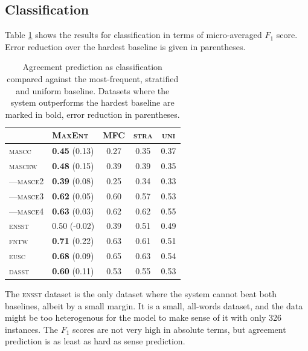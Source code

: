 \documentclass[11pt,a4paper]{article}
\begin{document}
\subsection{Classification}
\label{sec:class}

Table \ref{tab:classresults} shows the results for classification in terms of micro-averaged $F_1$ score. Error reduction over the hardest baseline is given in parentheses.

\begin{table}[Ht!]

\begin{center}
  \begin{tabular}{ll|ccc}
 \toprule
 & \textsc{MaxEnt} & \textsc{MFC} & \textsc{stra} & \textsc{uni} \\
 \midrule
 \textsc{mascc} & \textbf{0.45} (0.13) & 0.27 & 0.35 & 0.37\\ 

 \textsc{mascew} & \textbf{0.48} (0.15)  & 0.39 & 0.39 & 0.35\\ 
---\textsc{masce2} & \textbf{0.39} (0.08) & 0.25 & 0.34 & 0.33\\ 
---\textsc{masce3} & \textbf{0.62} (0.05) & 0.60 & 0.57 & 0.53\\ 
---\textsc{masce4} & \textbf{0.63} (0.03)& 0.62 & 0.62 & 0.55\\ 
\textsc{ensst}  & 0.50 (-0.02) & 0.39 & 0.51 & 0.49\\ 
\textsc{fntw} & \textbf{0.71} (0.22) & 0.63 & 0.61 & 0.51\\ 

\textsc{eusc}  & \textbf{0.68} (0.09) & 0.65 & 0.63 & 0.54 \\
\textsc{dasst} & \textbf{0.60} (0.11) & 0.53 & 0.55 & 0.53\\ 

\bottomrule

  \end{tabular}  
\end{center}
\caption{Agreement prediction as classification compared against the most-frequent, stratified and uniform baseline. Datasets where the system outperforms the hardest baseline are marked in bold, error reduction in parentheses. \label{tab:classresults}}
\end{table} 

The \textsc{ensst} dataset is the only dataset where the system cannot beat both baselines, albeit by a small margin. It is a small, all-words dataset, and the data might be too heterogenous for the model to make sense of it with only 326 instances. The $F_1$ scores are not very high in absolute terms, but agreement prediction is as least as hard as sense prediction.
\end{document}
